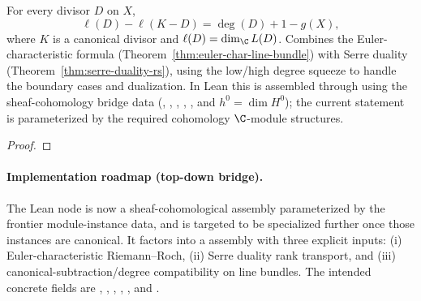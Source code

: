 
\begin{theorem}
\label{input:riemann-roch}

For every divisor \(D\) on \(X\),
\[
  \ell(D)-\ell(K-D)=\deg(D)+1-g(X),
\]
where \(K\) is a canonical divisor and \(\ell(D)=\dim_{\C} L(D)\).
Combines the Euler-characteristic formula
(Theorem~\ref{thm:euler-char-line-bundle}) with Serre duality
(Theorem~\ref{thm:serre-duality-rs}), using the low/high degree squeeze
to handle the boundary cases and dualization. In Lean this is assembled
through  using the sheaf-cohomology
bridge data (, ,
, , ,
and \(h^0=\dim H^0\)); the current statement is parameterized by the
required cohomology \(\C\)-module structures.
\leanok
\end{theorem}
\begin{proof}
\leanok\end{proof}

\paragraph{Implementation roadmap (top-down bridge).}
The Lean node  is now a sheaf-cohomological
assembly parameterized by the frontier module-instance data, and is targeted
to be specialized further once those instances are canonical. It factors into a
assembly with three explicit inputs: (i) Euler-characteristic Riemann--Roch,
(ii) Serre duality rank transport, and (iii) canonical-subtraction/degree
compatibility on line bundles. The intended concrete fields are
, , ,
, , and
.

